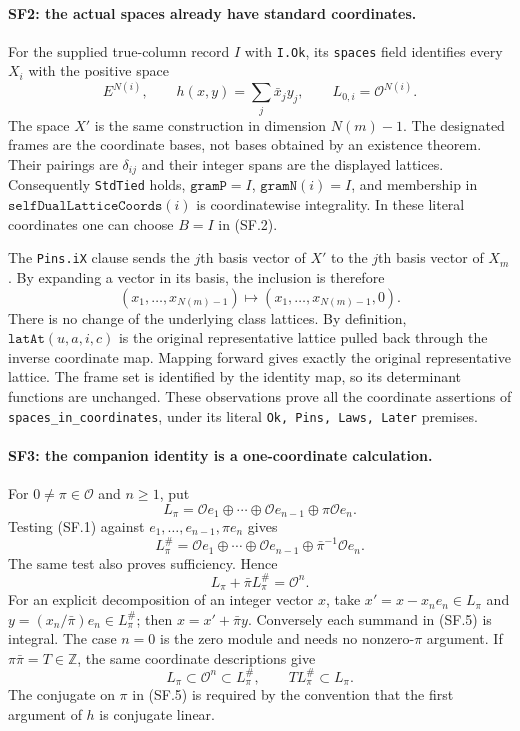 \documentclass[11pt,a4paper]{article}
\numberwithin{equation}{section}
\theoremstyle{remark}\newtheorem{remark}[theorem]{Remark}
\begin{document}
\paragraph{SF2: the actual spaces already have standard coordinates.}
For the supplied true-column record $I$ with \texttt{I.Ok}, its
\texttt{spaces} field identifies every $X_i$ with the positive space
\[
 E^{N(i)},\qquad h(x,y)=\sum_j\bar x_jy_j,
 \qquad L_{0,i}=\mathcal O^{N(i)}.
                                                               \tag{SF.3}
\]
The space $X'$ is the same construction in dimension $N(m)-1$.
The designated frames are the coordinate bases, not bases obtained by
an existence theorem. Their pairings are $\delta_{ij}$ and their
integer spans are the displayed lattices. Consequently
\texttt{StdTied} holds, $\texttt{gramP}=I$,
$\texttt{gramN}(i)=I$, and membership in
$\texttt{selfDualLatticeCoords}(i)$ is coordinatewise integrality.
In these literal coordinates one can choose $B=I$ in (SF.2).

The \texttt{Pins.iX} clause sends the $j$th basis vector of $X'$ to
the $j$th basis vector of $X_m$. By expanding a vector in its basis,
the inclusion is therefore
\[
 (x_1,\ldots,x_{N(m)-1})\longmapsto
 (x_1,\ldots,x_{N(m)-1},0).                              \tag{SF.4}
\]
There is no change of the underlying class lattices. By definition,
$\texttt{latAt}(u,a,i,c)$ is the original representative lattice pulled
back through the inverse coordinate map. Mapping forward gives exactly
the original representative lattice. The frame set is identified by the
identity map, so its determinant functions are unchanged. These observations
prove all the coordinate assertions of
\texttt{spaces\_in\_coordinates}, under its literal
\texttt{Ok, Pins, Laws, Later} premises.

\paragraph{SF3: the companion identity is a one-coordinate calculation.}
For $0\ne\pi\in\mathcal O$ and $n\ge1$, put
\[
 L_\pi=\mathcal O e_1\oplus\cdots\oplus\mathcal O e_{n-1}
                         \oplus\pi\mathcal O e_n.
\]
Testing (SF.1) against $e_1,\ldots,e_{n-1},\pi e_n$ gives
\[
 L_\pi^\#=
 \mathcal O e_1\oplus\cdots\oplus\mathcal O e_{n-1}
                         \oplus\bar\pi^{-1}\mathcal O e_n.
\]
The same test also proves sufficiency. Hence
\[
 \boxed{\ L_\pi+\bar\pi L_\pi^\#=\mathcal O^n.\ }       \tag{SF.5}
\]
For an explicit decomposition of an integer vector $x$, take
$x'=x-x_ne_n\in L_\pi$ and
$y=(x_n/\bar\pi)e_n\in L_\pi^\#$; then
$x=x'+\bar\pi y$. Conversely each summand in (SF.5) is integral.
The case $n=0$ is the zero module and needs no nonzero-$\pi$ argument.
If $\pi\bar\pi=T\in\mathbb Z$, the same coordinate descriptions give
\[
 L_\pi\subset\mathcal O^n\subset L_\pi^\#,
 \qquad T L_\pi^\#\subset L_\pi.                       \tag{SF.6}
\]
The conjugate on $\pi$ in (SF.5) is required by the convention
that the first argument of $h$ is conjugate linear.
\end{document}
